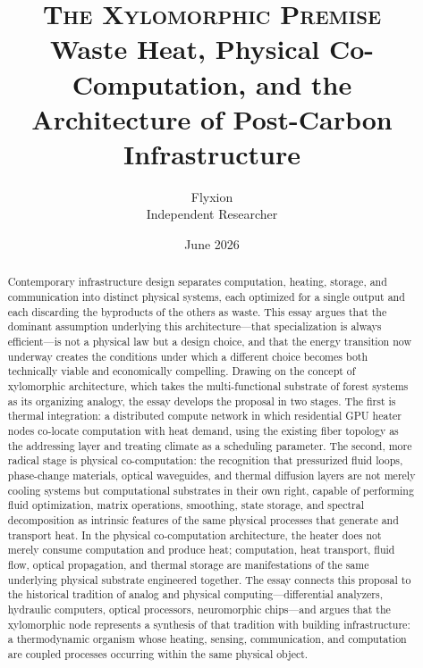 \documentclass[12pt, oneside]{article}
\title{\vspace{-1.2cm}%
  {\large\scshape The Xylomorphic Premise}\\[0.5em]
  {\normalsize Waste Heat, Physical Co-Computation, and the\\
  Architecture of Post-Carbon Infrastructure}
}
\author{Flyxion\\[0.3em]
  \small Independent Researcher}
\date{\small June 2026}
\begin{document}
\maketitle
\thispagestyle{fancy}

\begin{abstract}
\noindent Contemporary infrastructure design separates computation, heating, storage, and communication into distinct physical systems, each optimized for a single output and each discarding the byproducts of the others as waste. This essay argues that the dominant assumption underlying this architecture---that specialization is always efficient---is not a physical law but a design choice, and that the energy transition now underway creates the conditions under which a different choice becomes both technically viable and economically compelling. Drawing on the concept of xylomorphic architecture, which takes the multi-functional substrate of forest systems as its organizing analogy, the essay develops the proposal in two stages. The first is thermal integration: a distributed compute network in which residential GPU heater nodes co-locate computation with heat demand, using the existing fiber topology as the addressing layer and treating climate as a scheduling parameter. The second, more radical stage is physical co-computation: the recognition that pressurized fluid loops, phase-change materials, optical waveguides, and thermal diffusion layers are not merely cooling systems but computational substrates in their own right, capable of performing fluid optimization, matrix operations, smoothing, state storage, and spectral decomposition as intrinsic features of the same physical processes that generate and transport heat. In the physical co-computation architecture, the heater does not merely consume computation and produce heat; computation, heat transport, fluid flow, optical propagation, and thermal storage are manifestations of the same underlying physical substrate engineered together. The essay connects this proposal to the historical tradition of analog and physical computing---differential analyzers, hydraulic computers, optical processors, neuromorphic chips---and argues that the xylomorphic node represents a synthesis of that tradition with building infrastructure: a thermodynamic organism whose heating, sensing, communication, and computation are coupled processes occurring within the same physical object.
\end{abstract}

\newpage
\end{document}
